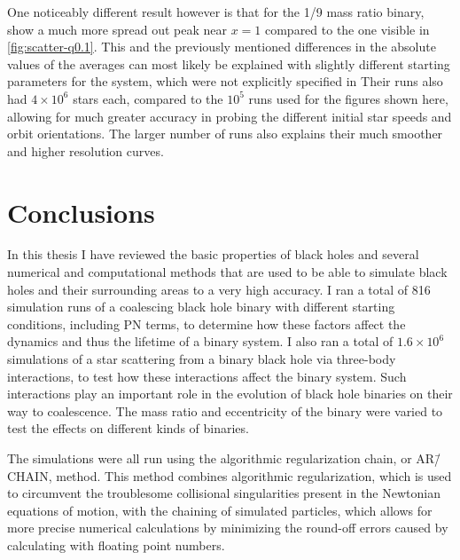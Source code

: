 \documentclass[english, oneside]{HYgradu}
\begin{document}
One noticeably different result however is that for the 1/9 mass ratio binary, \citeauthor{sesana:2006} show a much more spread out peak near $x=1$ compared to the one visible in \ref{fig:scatter-q0.1}. This and the previously mentioned differences in the absolute values of the averages can most likely be explained with slightly different starting parameters for the system, which were not explicitly specified in \citeauthor{sesana:2006} Their runs also had $4 \times 10^6$ stars each, compared to the $10^5$ runs used for the figures shown here, allowing for much greater accuracy in probing the different initial star speeds and orbit orientations. The larger number of runs also explains their much smoother and higher resolution curves.


\chapter{Conclusions}

In this thesis I have reviewed the basic properties of black holes and several numerical and computational methods that are used to be able to simulate black holes and their surrounding areas to a very high accuracy. I ran a total of 816 simulation runs of a coalescing black hole binary with different starting conditions, including PN terms, to determine how these factors affect the dynamics and thus the lifetime of a binary system. I also ran a total of $1.6 \times 10^6$ simulations of a star scattering from a binary black hole via three-body interactions, to test how these interactions affect the binary system. Such interactions play an important role in the evolution of black hole binaries on their way to coalescence. The mass ratio and eccentricity of the binary were varied to test the effects on different kinds of binaries.

The simulations were all run using the algorithmic regularization chain, or AR\=/CHAIN, method. This method combines algorithmic regularization, which is used to circumvent the troublesome collisional singularities present in the Newtonian equations of motion, with the chaining of simulated particles, which allows for more precise numerical calculations by minimizing the round-off errors caused by calculating with floating point numbers.
\end{document}
